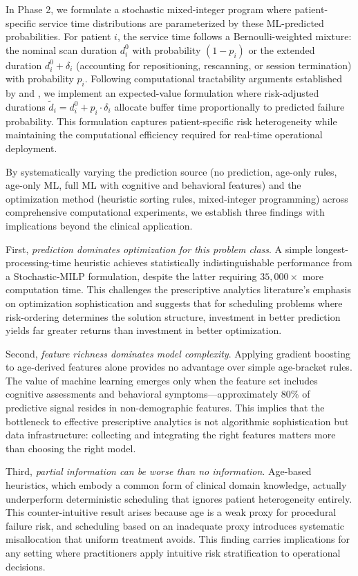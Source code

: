 \documentclass[11pt,a4paper]{article}
\begin{document}
In Phase 2, we formulate a stochastic mixed-integer program where patient-specific service time distributions are parameterized by these ML-predicted probabilities. For patient $i$, the service time follows a Bernoulli-weighted mixture: the nominal scan duration $d_i^0$ with probability $(1-p_i)$ or the extended duration $d_i^0 + \delta_i$ (accounting for repositioning, rescanning, or session termination) with probability $p_i$. Following computational tractability arguments established by \citet{denton2003sequential} and \citet{mancilla2012sample}, we implement an expected-value formulation where risk-adjusted durations $\tilde{d}_i = d_i^0 + p_i \cdot \delta_i$ allocate buffer time proportionally to predicted failure probability. This formulation captures patient-specific risk heterogeneity while maintaining the computational efficiency required for real-time operational deployment.

By systematically varying the prediction source (no prediction, age-only rules, age-only ML, full ML with cognitive and behavioral features) and the optimization method (heuristic sorting rules, mixed-integer programming) across comprehensive computational experiments, we establish three findings with implications beyond the clinical application.

First, \textit{prediction dominates optimization for this problem class}. A simple longest-processing-time heuristic achieves statistically indistinguishable performance from a Stochastic-MILP formulation, despite the latter requiring $35{,}000\times$ more computation time. This challenges the prescriptive analytics literature's emphasis on optimization sophistication and suggests that for scheduling problems where risk-ordering determines the solution structure, investment in better prediction yields far greater returns than investment in better optimization.

Second, \textit{feature richness dominates model complexity}. Applying gradient boosting to age-derived features alone provides no advantage over simple age-bracket rules. The value of machine learning emerges only when the feature set includes cognitive assessments and behavioral symptoms---approximately 80\% of predictive signal resides in non-demographic features. This implies that the bottleneck to effective prescriptive analytics is not algorithmic sophistication but data infrastructure: collecting and integrating the right features matters more than choosing the right model.

Third, \textit{partial information can be worse than no information}. Age-based heuristics, which embody a common form of clinical domain knowledge, actually underperform deterministic scheduling that ignores patient heterogeneity entirely. This counter-intuitive result arises because age is a weak proxy for procedural failure risk, and scheduling based on an inadequate proxy introduces systematic misallocation that uniform treatment avoids. This finding carries implications for any setting where practitioners apply intuitive risk stratification to operational decisions.
\end{document}
